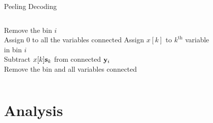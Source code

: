 \documentclass[10pt]{beamer}
\begin{document}
\begin{frame}{Peeling Decoding}
\begin{columns}
\begin{column}{0.55\textwidth}
\begin{algorithmic}
    \State Remove the bin $i$\\
   \hspace{2ex} Assign $0$ to all the variables connected
   \hspace{4ex} Assign $x[k]$ to $k^{\text{th}}$ variable in bin $i$\\
  \hspace{2ex} Subtract $x[k]\mathbf{s}_k$ from connected $\mathbf{y}_i$  \\
  \hspace{2ex} Remove the bin and all variables connected
\EndIf
\EndWhile
\end{algorithmic}
\end{column}

\begin{column}{0.45\textwidth}
\begin{figure}
\scalebox{5}{}
\end{figure}
\end{column}
\end{columns}
\end{frame}


\section{Analysis}
\end{document}
